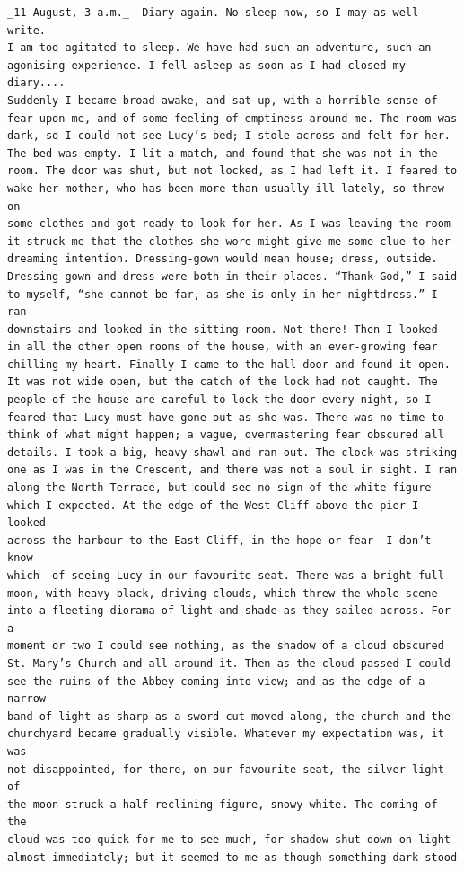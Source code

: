\documentclass{article}
\begin{document}
\begin{verbatim}
_11 August, 3 a.m._--Diary again. No sleep now, so I may as well write.
I am too agitated to sleep. We have had such an adventure, such an
agonising experience. I fell asleep as soon as I had closed my diary....
Suddenly I became broad awake, and sat up, with a horrible sense of
fear upon me, and of some feeling of emptiness around me. The room was
dark, so I could not see Lucy’s bed; I stole across and felt for her.
The bed was empty. I lit a match, and found that she was not in the
room. The door was shut, but not locked, as I had left it. I feared to
wake her mother, who has been more than usually ill lately, so threw on
some clothes and got ready to look for her. As I was leaving the room
it struck me that the clothes she wore might give me some clue to her
dreaming intention. Dressing-gown would mean house; dress, outside.
Dressing-gown and dress were both in their places. “Thank God,” I said
to myself, “she cannot be far, as she is only in her nightdress.” I ran
downstairs and looked in the sitting-room. Not there! Then I looked
in all the other open rooms of the house, with an ever-growing fear
chilling my heart. Finally I came to the hall-door and found it open.
It was not wide open, but the catch of the lock had not caught. The
people of the house are careful to lock the door every night, so I
feared that Lucy must have gone out as she was. There was no time to
think of what might happen; a vague, overmastering fear obscured all
details. I took a big, heavy shawl and ran out. The clock was striking
one as I was in the Crescent, and there was not a soul in sight. I ran
along the North Terrace, but could see no sign of the white figure
which I expected. At the edge of the West Cliff above the pier I looked
across the harbour to the East Cliff, in the hope or fear--I don’t know
which--of seeing Lucy in our favourite seat. There was a bright full
moon, with heavy black, driving clouds, which threw the whole scene
into a fleeting diorama of light and shade as they sailed across. For a
moment or two I could see nothing, as the shadow of a cloud obscured
St. Mary’s Church and all around it. Then as the cloud passed I could
see the ruins of the Abbey coming into view; and as the edge of a narrow
band of light as sharp as a sword-cut moved along, the church and the
churchyard became gradually visible. Whatever my expectation was, it was
not disappointed, for there, on our favourite seat, the silver light of
the moon struck a half-reclining figure, snowy white. The coming of the
cloud was too quick for me to see much, for shadow shut down on light
almost immediately; but it seemed to me as though something dark stood

\end{verbatim}
\end{document}

